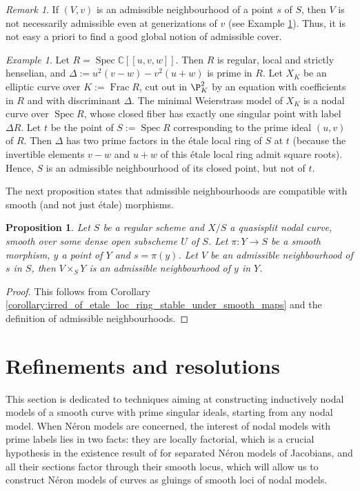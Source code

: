 \documentclass[a4paper,12pt]{amsart} %
\numberwithin{equation}{subsection}
\newcommand{\Frac}{\operatorname{Frac}}
\newcommand{\Spec}{\operatorname{Spec}}
\theoremstyle{definition}
\theoremstyle{plain}%
\newtheorem{proposition}[definition]{Proposition}
\theoremstyle{remark}
\newtheorem{remark}[definition]{Remark}
\newtheorem{example}[definition]{Example}
\begin{document}
\begin{remark}
If $(V,v)$ is an admissible neighbourhood of a point $s$ of $S$, then $V$ is not necessarily admissible even at generizations of $v$ (see Example \ref{example:irred_not_etale_irred}). Thus, it is not easy a priori to find a good global notion of admissible cover.
\end{remark}

\begin{example}\label{example:irred_not_etale_irred}
Let $R=\Spec\mathbb{C}[[u,v,w]]$. Then $R$ is regular, local and strictly henselian, and $\Delta:=u^2(v-w)-v^2(u+w)$ is prime in $R$. Let $X_K$ be an elliptic curve over $K:=\Frac R$, cut out in $\P^2_K$ by an equation with coefficients in $R$ and with discriminant $\Delta$. The minimal Weierstrass model of $X_K$ is a nodal curve over $\Spec R$, whose closed fiber has exactly one singular point with label $\Delta R$. Let $t$ be the point of $S:=\Spec R$ corresponding to the prime ideal $(u,v)$ of $R$. Then $\Delta$ has two prime factors in the étale local ring of $S$ at $t$ (because the invertible elements $v-w$ and $u+w$ of this étale local ring admit square roots). Hence, $S$ is an admissible neighbourhood of its closed point, but not of $t$.
\end{example}

The next proposition states that admissible neighbourhoods are compatible with smooth (and not just \'etale) morphisms.


\begin{proposition}\label{proposition:admissibles_compatible_with_smooth_basechange}
Let $S$ be a regular scheme and $X/S$ a quasisplit nodal curve, smooth over some dense open subscheme $U$ of $S$. Let $\pi\colon Y\to S$ be a smooth morphism, $y$ a point of $Y$ and $s=\pi(y)$. Let $V$ be an admissible neighbourhood of $s$ in $S$, then $V\times_S Y$ is an admissible neighbourhood of $y$ in $Y$.
\end{proposition}

\begin{proof}
This follows from Corollary \ref{corollary:irred_of_etale_loc_ring_stable_under_smooth_maps} and the definition of admissible neighbourhoods.
\end{proof}


\section{Refinements and resolutions}\label{section1}
This section is dedicated to techniques aiming at constructing inductively nodal models of a smooth curve with prime singular ideals, starting from any nodal model. When Néron models are concerned, the interest of nodal models with prime labels lies in two facts: they are locally factorial, which is a crucial hypothesis in the existence result of \cite{Holmes} for separated Néron models of Jacobians, and all their sections factor through their smooth locus, which will allow us to construct Néron models of curves as gluings of smooth loci of nodal models.
\end{document}
